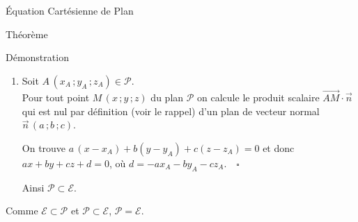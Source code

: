 \documentclass{cours}
\begin{document}
\begin{Gpartie}{Équation Cartésienne de Plan}
\begin{Spartie}{Théorème}
\begin{SSpartie}{Démonstration}
\begin{enumerate}[(1)]
                    C'est identique pour les points $\left(0\,; \frac{-d}{b}\,; 0\right)$ ou $\left(0\,; 0\,; \frac{-d}{c}\right)$.
                    
                    Donc, quel que soit $M~\left(x\,; y\,; z\right)\in\mathcal{E}$ :
                    \[\begin{aligned}[t]
                        \overrightarrow{AM}\cdot\vec{n}=0&\iff\begin{psmallmatrix} x-\frac{-d}{a} \\ y \\ z\end{psmallmatrix}\cdot \begin{psmallmatrix}a \\ b \\ c\end{psmallmatrix} \\ &\iff a x+by+cz+d=0 %
                    \end{aligned}\]

                    Donc, tout point $M$ de $\mathcal{E}$ vérifie $\overrightarrow{AM}\cdot\vec{n}=0$, donc appartient au plan passant par $A$ et de vecteur normal $\vec{n}$. (c'est la caractérisation d'un plan) $\quad\square$

                    Ainsi, $\mathcal{E}\subset\mathcal{P}$.

                    \item   Soit $A\,\left(x_A\,; y_A\,; z_A\right)\in\mathcal{P}$. \\ Pour tout point $M\,\left(x\,; y\,; z\right)$ du plan $\mathcal{P}$ on calcule le produit scalaire $\overrightarrow{AM}\cdot\vec{n}$ qui est nul par définition (voir le rappel) d'un plan de vecteur normal $\vec{n}\,\left(a\,; b\,; c\right)$.
                    
                    On trouve $a\,\left(x-x_A\right)+b\left(y-y_A\right)+c\left(z-z_A\right)=0$ et donc $ax+by+cz+d=0$, où $d=-ax_A-by_A-cz_A.\quad\square$

                    Ainsi $\mathcal{P}\subset\mathcal{E}$.
                \end{enumerate}
                \vspace*{2ex}
                Comme $\mathcal{E}\subset\mathcal{P}$ et $\mathcal{P}\subset\mathcal{E}$, $\mathcal{P}=\mathcal{E}$.
            \end{SSpartie}
        \end{Spartie}
    \end{Gpartie}
\end{document}
